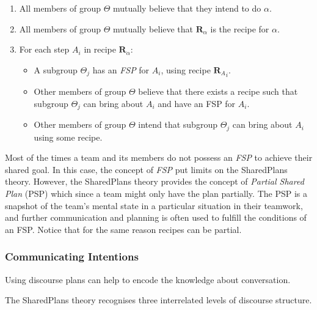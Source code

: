 \documentclass[11pt]{article}
\begin{document}
\begin{enumerate}
  \item All members of group $\Theta$ mutually believe that they intend to do
  $\alpha$.
  \item All members of group $\Theta$ mutually believe that
  \textit{$\textbf{R}_\alpha$} is the recipe for $\alpha$.
  \item For each step \textit{$A_i$} in recipe \textit{$\textbf{R}_\alpha$}:
  \begin{itemize}
    \item A subgroup $\Theta_j$ has an \textit{FSP} for \textit{$A_i$}, using
    recipe \textit{${\textbf{R}_A}_i$}.
    \item Other members of group $\Theta$ believe that there exists a recipe
    such that subgroup $\Theta_j$ can bring about \textit{$A_i$} and have an FSP
    for \textit{$A_i$}.
    \item Other members of group $\Theta$ intend that subgroup $\Theta_j$ can
    bring about \textit{$A_i$} using some recipe.
  \end{itemize}
\end{enumerate}

Most of the times a team and its members do not possess an \textit{FSP} to
achieve their shared goal. In this case, the concept of \textit{FSP} put limits
on the SharedPlans theory. However, the SharedPlans theory provides the concept
of \textit{Partial Shared Plan} (PSP) which since a team might only have the
plan partially. The PSP is a snapshot of the team's mental state in a particular
situation in their teamwork, and further communication and planning is often
used to fulfill the conditions of an FSP. Notice that for the same reason
recipes can be partial.

\subsubsection{Communicating Intentions}

Using discourse plans can help to encode the knowledge about conversation.

The SharedPlans theory recognises three interrelated levels of discourse
structure.
\end{document}
